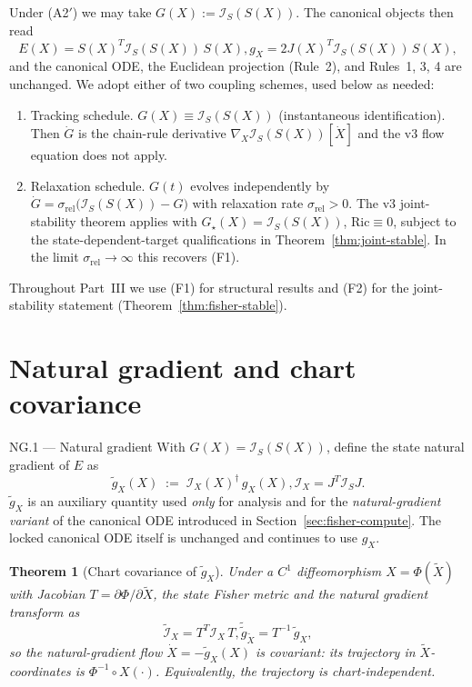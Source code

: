\documentclass[11pt,oneside]{amsart}
\def\qquad{ }%
\def\textbf#1{#1}%
\theoremstyle{plain}
\newtheorem{theorem}{Theorem}[section]
\theoremstyle{definition}
\newcommand{\Xdot}{\dot{X}}
\newcommand{\gX}{g_X}
\begin{document}
Under \textup{(A2$'$)} we may take $G(X) := \mathcal{I}_{S}(S(X))$. The
canonical objects then read
\[
  E(X) = S(X)^{T}\mathcal{I}_{S}(S(X))\,S(X),
  \qquad
  \gX = 2 J(X)^{T}\mathcal{I}_{S}(S(X))\,S(X),
\]
and the canonical ODE, the Euclidean projection (Rule~2), and Rules~1,
3, 4 are unchanged. We adopt either of two coupling schemes, used
below as needed:
\begin{enumerate}[leftmargin=1.8em,label=(F\arabic*)]
    \item \textbf{Tracking schedule.} $G(X)\equiv \mathcal{I}_{S}(S(X))$
        (instantaneous identification). Then $\dot G$ is the chain-rule
      derivative $\nabla_{X}\mathcal{I}_{S}(S(X))[\Xdot]$ and the v3
        flow equation does not apply.
  \item \textbf{Relaxation schedule.} $G(t)$ evolves independently by
      $\dot G = \sigma_{\mathrm{rel}}\bigl(\mathcal{I}_{S}(S(X))-G\bigr)$
        with relaxation rate $\sigma_{\mathrm{rel}}>0$. The v3
        joint-stability theorem applies with
      $G_{\star}(X)=\mathcal{I}_{S}(S(X))$, $\mathrm{Ric}\equiv 0$,
      subject to the state-dependent-target qualifications in
      Theorem~\ref{thm:joint-stable}.
        In the limit $\sigma_{\mathrm{rel}}\to\infty$ this recovers
        (F1).
\end{enumerate}
Throughout Part~III we use (F1) for structural results and (F2) for
the joint-stability statement (Theorem~\ref{thm:fisher-stable}).

\section{Natural gradient and chart covariance}
\label{sec:nat-grad}

\begin{defbox}{NG.1 --- Natural gradient}
With $G(X)=\mathcal{I}_{S}(S(X))$, define the state natural gradient of
$E$ as
\[
  \boxed{\;\widetilde\gX(X) \;:=\; \mathcal{I}_{X}(X)^{\dagger}\,\gX(X),
           \qquad \mathcal{I}_{X}=J^{T}\mathcal{I}_{S}J.\;}
\]
$\widetilde\gX$ is an auxiliary quantity used \emph{only} for analysis
and for the \emph{natural-gradient variant} of the canonical ODE
introduced in Section~\ref{sec:fisher-compute}. The locked canonical
ODE itself is unchanged and continues to use $\gX$.
\end{defbox}

\begin{theorem}[Chart covariance of $\widetilde\gX$]
\label{thm:nat-grad}
Under a $C^{1}$ diffeomorphism $X = \Phi(\widetilde X)$ with Jacobian
 $T = \partial\Phi/\partial\widetilde X$, the state Fisher metric and the
natural gradient transform as
\[
  \widetilde{\mathcal{I}}_{X} = T^{T}\mathcal{I}_{X}\,T,
  \qquad
  \widetilde{\widetilde{g}}_{\widetilde X} = T^{-1}\,\widetilde\gX,
\]
so the natural-gradient \emph{flow} $\dot X = -\widetilde\gX(X)$ is
covariant: its trajectory in $\widetilde X$-coordinates is
$\Phi^{-1}\circ X(\cdot)$. Equivalently, the trajectory is
chart-independent.
\end{theorem}
\end{document}
